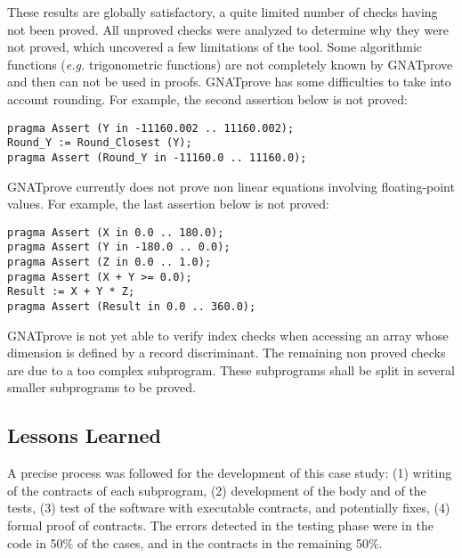 \documentclass[10pt,a4paper,twocolumn]{article}
\newcommand{\gnatprove}{GNATprove\xspace}
\newcommand{\eg}{\textit{e.g.}\xspace}
\begin{document}
These results are globally satisfactory, a quite limited number of checks having not been proved.
All unproved checks were analyzed to determine why they were not proved, which
uncovered a few limitations of the tool. Some algorithmic functions
(\eg trigonometric functions) are not completely known by \gnatprove and then
can not be used in proofs. \gnatprove has some difficulties to take into account rounding. For example, the second assertion below is not proved:
\begin{lstlisting}
pragma Assert (Y in -11160.002 .. 11160.002);
Round_Y := Round_Closest (Y);
pragma Assert (Round_Y in -11160.0 .. 11160.0);
\end{lstlisting}
\gnatprove currently does not prove non linear equations involving floating-point values. For example, the last assertion below is not proved:
\begin{lstlisting}
pragma Assert (X in 0.0 .. 180.0);
pragma Assert (Y in -180.0 .. 0.0);
pragma Assert (Z in 0.0 .. 1.0);
pragma Assert (X + Y >= 0.0);
Result := X + Y * Z;
pragma Assert (Result in 0.0 .. 360.0);
\end{lstlisting}
\gnatprove is not yet able to verify index checks when accessing an array whose
dimension is defined by a record discriminant.
The remaining non proved checks are due to a too complex subprogram.
These subprograms shall be split in several smaller subprograms to be proved.


\subsection{Lessons Learned}

A precise process was followed for the development of this case study:
(1) writing of the contracts of each subprogram,
(2) development of the body and of the tests,
(3) test of the software with executable contracts, and potentially fixes,
(4) formal proof of contracts.
The errors detected in the testing phase were in the code
in 50\% of the cases, and in the contracts in the remaining 50\%.
\end{document}
